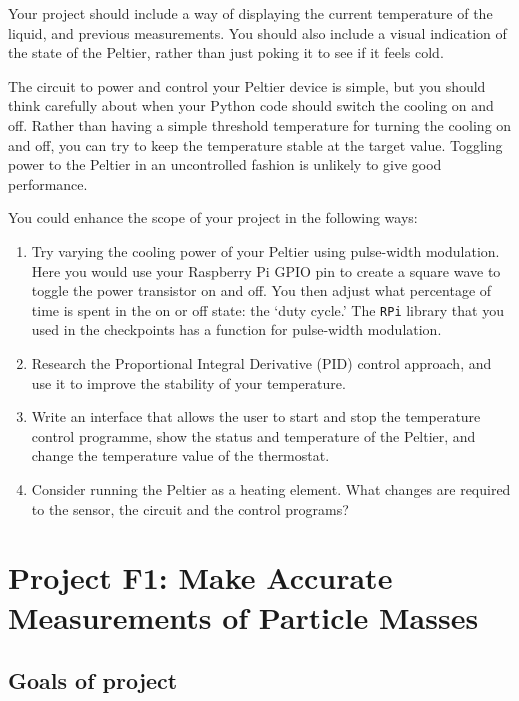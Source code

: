 Your project should include a way of displaying the current temperature of the liquid, and previous measurements.
You should also include a visual indication of the state of the Peltier, rather than just poking it to see if it feels cold.

The circuit to power and control your Peltier device is simple, but you should think carefully about when your Python code should switch the cooling on and off.
Rather than having a simple threshold temperature for turning the cooling on and off, you can try to keep the temperature stable at the target value.
Toggling power to the Peltier in an uncontrolled fashion is unlikely to give good performance.

\newpage
You could enhance the scope of your project in the following ways:
\begin{enumerate}
  \item Try varying the cooling power of your Peltier using pulse-width modulation.
    Here you would use your Raspberry Pi GPIO pin to create a square wave to toggle the power transistor on and off.
    You then adjust what percentage of time is spent in the on or off state: the `duty cycle.'
    The \texttt{RPi} library that you used in the checkpoints has a function for pulse-width modulation.
  \item Research the Proportional Integral Derivative (PID) control approach, and use it to improve the stability of your temperature.
  \item Write an interface that allows the user to start and stop the temperature control programme, show the status and temperature of the Peltier, and change the temperature value of the thermostat.
  \item Consider running the Peltier as a heating element.
    What changes are required to the sensor, the circuit and the control programs?
\end{enumerate}


 
 
 
\newpage
\section{Project F1: Make Accurate Measurements of Particle Masses}

\subsection{Goals of project}

